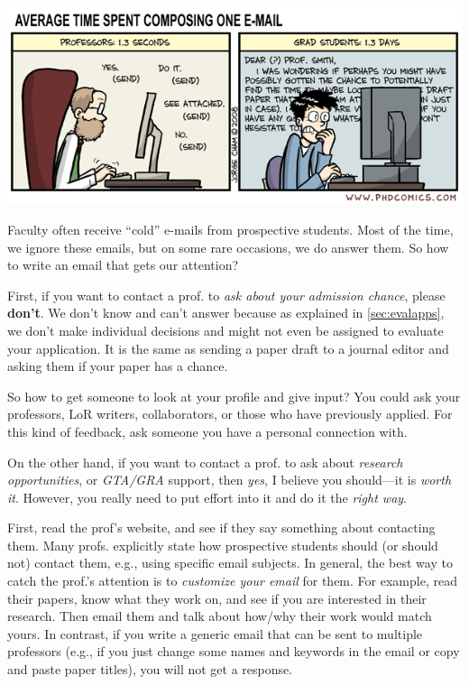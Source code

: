 \documentclass[oneside,11pt,dvipsnames]{book}
\begin{document}
\begin{center}
  \includegraphics[scale=0.6]{files/emails.png}
\end{center}


Faculty often receive ``cold'' e-mails from prospective students. Most of the time, we ignore these emails, but on some rare occasions, we do answer them. So how to write an email that gets our attention?

First, if you want to contact a prof. to \emph{ask about your admission chance}, please \textbf{don't}. We don't know and can't answer because as explained in \autoref{sec:evalapps}, we don't make individual decisions and might not even be assigned to evaluate your application.  It is the same as sending a paper draft to a journal editor and asking them if your paper has a chance.

So how to get someone to look at your profile and give input? You could ask your professors, LoR writers, collaborators, or those who have previously applied. For this kind of feedback, ask someone you have a personal connection with.

On the other hand, if you want to contact a prof. to ask about \emph{research opportunities}, or \emph{GTA/GRA} support, then \emph{yes}, I believe you should---it is \emph{worth it}. However, you really need to put effort into it and do it the \emph{right way}.

First, read the prof's website, and see if they say something about contacting them. Many profs. explicitly state how prospective students should (or should not) contact them, e.g., using specific email subjects.
In general, the best way to catch the prof.'s attention is to \emph{customize your email} for them.  For example, read their papers, know what they work on, and see if you are interested in their research. Then email them and talk about how/why their work would match yours.
In contrast, if you write a generic email that can be sent to multiple professors (e.g., if you just change some names and keywords in the email or copy and paste paper titles), you will not get a response.
\end{document}
